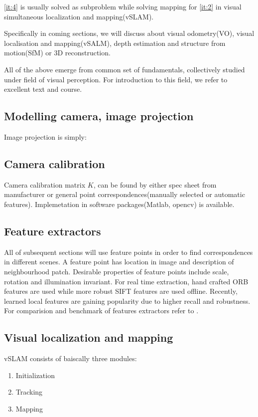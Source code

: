 \ref{it:4} is usually solved as subproblem while solving mapping for \ref{it:2} in visual simultaneous localization and mapping(vSLAM).

Specifically in coming sections, we will discuss about visual odometry(VO), visual localisation and mapping(vSALM), depth estimation and structure from motion(SfM) or 3D reconstruction.

All of the above emerge from common set of fundamentals, collectively studied under field of visual perception. For introduction to this field, we refer to excellent text \cite{ma2012invitation} and course\cite{perception_coursera:online}.

\subsection{Modelling camera, image projection}
Image projection is simply:
    

\subsection{Camera calibration}
Camera calibration matrix $K$, can be found by either spec sheet from manufacturer or general point correspondences(manually selected or automatic features). Implemetation in software packages(Matlab\cite{MatlabCa:online}, opencv\cite{OpenCVCa20:online}) is available.

\subsection{Feature extractors}
All of subsequent sections will use feature points in order to find correspondences in different scenes. A feature point has location in image and description of neighbourhood patch. Desirable properties of feature points include scale, rotation and illumination invariant. For real time extraction, hand crafted ORB features are used while more robust SIFT features are used offline. Recently, learned local features are gaining popularity due to higher recall and robustness. For comparision and benchmark of features extractors refer to \cite{hpatches_2017_cvpr} \cite{schoenberger2017comparative}. 


\subsection{Visual localization and mapping}
\label{sec:vslam}
vSLAM consists of baiscally three modules:
\begin{enumerate}
    \item Initialization
    \item Tracking
    \item Mapping
\end{enumerate}

